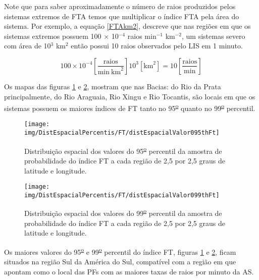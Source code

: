 
Note que para saber aproximadamente o número de raios produzidos pelos sistemas extremos de FTA temos que multiplicar o índice FTA pela área do sistema. Por exemplo, a equação \ref{FTAkm2}, descreve que nas regiões em que os sistemas extremos possuem 100 $\times$ 10$^{-4}$ raios min$^{-1}$ km$^{-2}$, um sistemas severo com área de 10$^3$ km$^2$ então possui 10 raios observados pelo LIS em 1 minuto.  

\begin{equation}
100 \times 10^{-4} \left[ \frac{\mathrm{raios}}{\mathrm{min}~\mathrm{km}^2} \right]  10^3 [ \mathrm{km}^2 ] = 10 \left[ \frac{\mathrm{raios}}{\mathrm{min}}\right]  
\label{FTAkm2}
\end{equation}

Os mapas das figuras \ref{95oFt} e \ref{99oFt}, mostram que nas Bacias: do Rio da Prata principalmente, do Rio Araguaia, Rio Xingu e Rio Tocantis, são locais em que os sistemas possuem os maiores índices de FT tanto no 95\textsuperscript{\underline{o}} quanto no 99\textsuperscript{\underline{o}} percentil.

\begin{figure}[!ht]
\centering
{\texttt{[image: img/DistEspacialPercentis/FT/distEspacialValor095thFt]}} 
\caption{Distribuição espacial dos valores do 95\textsuperscript{\underline{o}} percentil da amostra de probabilidade do índice FT a cada região de 2,5 por 2,5 graus de latitude e longitude.}
\label{95oFt}
\end{figure} 
  
\begin{figure}[!ht]
\centering  
{\texttt{[image: img/DistEspacialPercentis/FT/distEspacialValor099thFt]}}
\caption{Distribuição espacial dos valores do  99\textsuperscript{\underline{o}} percentil da amostra de probabilidade do índice FT a cada região de 2,5 por 2,5 graus de latitude e longitude.}
\label{99oFt}
\end{figure}

Os maiores valores do 95\textsuperscript{\underline{o}} e 99\textsuperscript{\underline{o}} percentil do índice FT, figuras \ref{95oFt} e \ref{99oFt},  ficam situados na região Sul da América do Sul, compatível com a região em que  apontam como o local das PFs com as maiores taxas de raios por minuto da AS.

